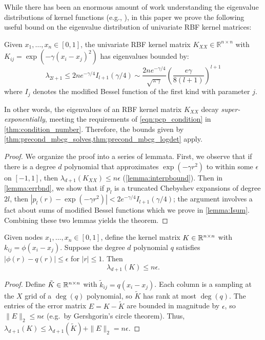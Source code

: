 While there has been an enormous amount of work understanding the eigenvalue distributions of kernel functions (e.g., \cite{wathen2015spectral}),
in this paper we prove the following useful bound on the eigenvalue distribution of univariate RBF kernel matrices:
%
\begin{lemma}
\label{thm:eigenvalue_bound}
Given $x_1, \ldots, x_n \in [0, 1]$, the univariate RBF kernel matrix $K_{XX} \in \mathbb{R}^{n \times n}$ with $K_{ij} = \exp \left(-\gamma(x_i - x_j)^{2}\right)$ has eigenvalues bounded by:
\begin{equation*}
  \lambda_{2l+1} \leq
  2n e^{-\gamma/4} I_{l+1}(\gamma/4) \sim
  \frac{2n e^{-\gamma/4}}{\sqrt{\pi\gamma}}
  \left( \frac{e\gamma}{8(l+1)} \right)^{l+1}
\end{equation*}
where $I_j$ denotes the modified Bessel function of the first kind with parameter $j$.
\end{lemma}
%
In other words, the eigenvalues of an RBF kernel matrix $K_{XX}$ decay \emph{super-exponentially}, meeting the requirements of \cref{eqn:pcp_condition} in \cref{thm:condition_number}.
Therefore, the bounds given by \cref{thm:precond_mbcg_solves,thm:precond_mbcg_logdet} apply.

\begin{proof}
  We organize the proof into a series of lemmata.  First, we observe
  that if there is a degree $d$ polynomial that approximates
  $\exp(-\gamma r^2)$ to within some $\epsilon$ on $[-1,1]$,
  then $\lambda_{d+1}(K_{XX}) \leq n\epsilon$
  (\cref{lemma:interpbound}).
  Then in \cref{lemma:errbnd}, we show that if $p_l$ is a
  truncated Chebyshev expansions of degree $2l$, then
  $|p_l(r)-\exp(-\gamma r^2)| < 2 e^{-\gamma/4} I_{l+1}(\gamma/4)$;
  the argument involves a fact about sums of modified Bessel functions
  which we prove in \cref{lemma:Isum}.
  Combining these two lemmas yields the theorem.
\end{proof}
%
\begin{lemma}\label{lemma:interpbound}
  Given nodes $x_1, \ldots, x_n \in [0,1]$, define the kernel matrix
  $K \in \mathbb{R}^{n \times n}$ with $k_{ij} = \phi(x_i-x_j)$.  Suppose
  the degree $d$ polynomial $q$ satisfies $|\phi(r)-q(r)| \leq
  \epsilon$ for $|r| \leq 1$.  Then
  \[
    \lambda_{d+1}(K) \leq n \epsilon.
  \]
\end{lemma}
\begin{proof}
  Define $\tilde{K} \in \mathbb{R}^{n \times n}$ with $\tilde{k}_{ij} = q(x_i-x_j)$.
  Each column is a sampling at the $X$ grid of a $\deg(q)$ polynomial, so
  $\tilde{K}$ has rank at most $\deg(q)$.  The entries of the
  error matrix $E = K-\tilde{K}$ are bounded in magnitude by
  $\epsilon$, so $\|E\|_2 \leq n\epsilon$ (e.g.~by Gershgorin's circle theorem).
  Thus, $\lambda_{d+1}(K) \leq \lambda_{d+1}(\tilde{K}) + \|E\|_2 = n\epsilon$.
\end{proof}



